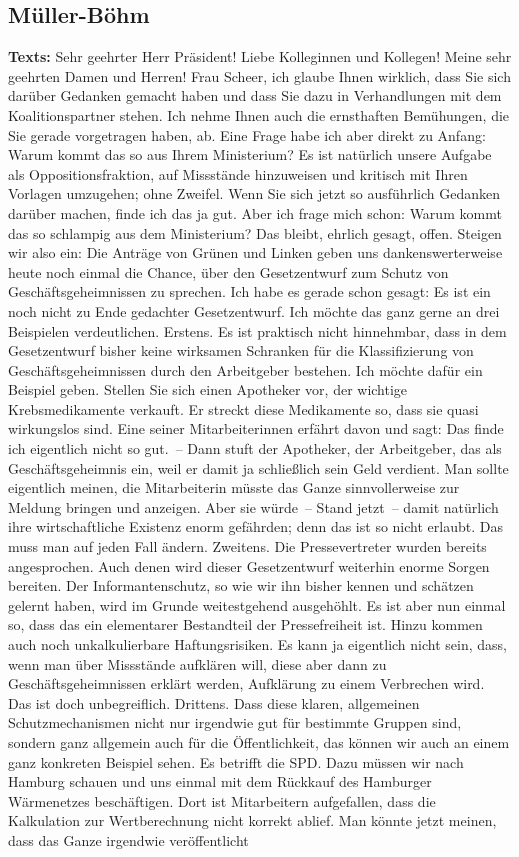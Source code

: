 \documentclass{article}
\begin{document}
\subsection{Müller-Böhm}
\noindent\textbf{Texts:} Sehr geehrter Herr Präsident! Liebe Kolleginnen und Kollegen! Meine sehr geehrten Damen und Herren! Frau Scheer, ich glaube Ihnen wirklich, dass Sie sich darüber Gedanken gemacht haben und dass Sie dazu in Verhandlungen mit dem Koalitionspartner stehen. Ich nehme Ihnen auch die ernsthaften Bemühungen, die Sie gerade vorgetragen haben, ab. Eine Frage habe ich aber direkt zu Anfang: Warum kommt das so aus Ihrem Ministerium?  Es ist natürlich unsere Aufgabe als Oppositionsfraktion, auf Missstände hinzuweisen und kritisch mit Ihren Vorlagen umzugehen; ohne Zweifel. Wenn Sie sich jetzt so ausführlich Gedanken darüber machen, finde ich das ja gut. Aber ich frage mich schon: Warum kommt das so schlampig aus dem Ministerium? Das bleibt, ehrlich gesagt, offen.  Steigen wir also ein: Die Anträge von Grünen und Linken geben uns dankenswerterweise heute noch einmal die Chance, über den Gesetzentwurf zum Schutz von Geschäftsgeheimnissen zu sprechen. Ich habe es gerade schon gesagt: Es ist ein noch nicht zu Ende gedachter Gesetzentwurf. Ich möchte das ganz gerne an drei Beispielen verdeutlichen. Erstens. Es ist praktisch nicht hinnehmbar, dass in dem Gesetzentwurf bisher keine wirksamen Schranken für die Klassifizierung von Geschäftsgeheimnissen durch den Arbeitgeber bestehen. Ich möchte dafür ein Beispiel geben. Stellen Sie sich einen Apotheker vor, der wichtige Krebsmedikamente verkauft. Er streckt diese Medikamente so, dass sie quasi wirkungslos sind. Eine seiner Mitarbeiterinnen erfährt davon und sagt: Das finde ich eigentlich nicht so gut. – Dann stuft der Apotheker, der Arbeitgeber, das als Geschäftsgeheimnis ein, weil er damit ja schließlich sein Geld verdient. Man sollte eigentlich meinen, die Mitarbeiterin müsste das Ganze sinnvollerweise zur Meldung bringen und anzeigen. Aber sie würde – Stand jetzt – damit natürlich ihre wirtschaftliche Existenz enorm gefährden; denn das ist so nicht erlaubt. Das muss man auf jeden Fall ändern. Zweitens. Die Pressevertreter wurden bereits angesprochen. Auch denen wird dieser Gesetzentwurf weiterhin enorme Sorgen bereiten. Der Informantenschutz, so wie wir ihn bisher kennen und schätzen gelernt haben, wird im Grunde weitestgehend ausgehöhlt. Es ist aber nun einmal so, dass das ein elementarer Bestandteil der Pressefreiheit ist. Hinzu kommen auch noch unkalkulierbare Haftungsrisiken. Es kann ja eigentlich nicht sein, dass, wenn man über Missstände aufklären will, diese aber dann zu Geschäftsgeheimnissen erklärt werden, Aufklärung zu einem Verbrechen wird. Das ist doch unbegreiflich.  Drittens. Dass diese klaren, allgemeinen Schutzmechanismen nicht nur irgendwie gut für bestimmte Gruppen sind, sondern ganz allgemein auch für die Öffentlichkeit, das können wir auch an einem ganz konkreten Beispiel sehen. Es betrifft die SPD. Dazu müssen wir nach Hamburg schauen und uns einmal mit dem Rückkauf des Hamburger Wärmenetzes beschäftigen.  Dort ist Mitarbeitern aufgefallen, dass die Kalkulation zur Wertberechnung nicht korrekt ablief. Man könnte jetzt meinen, dass das Ganze irgendwie veröffentlicht 
\end{document}
